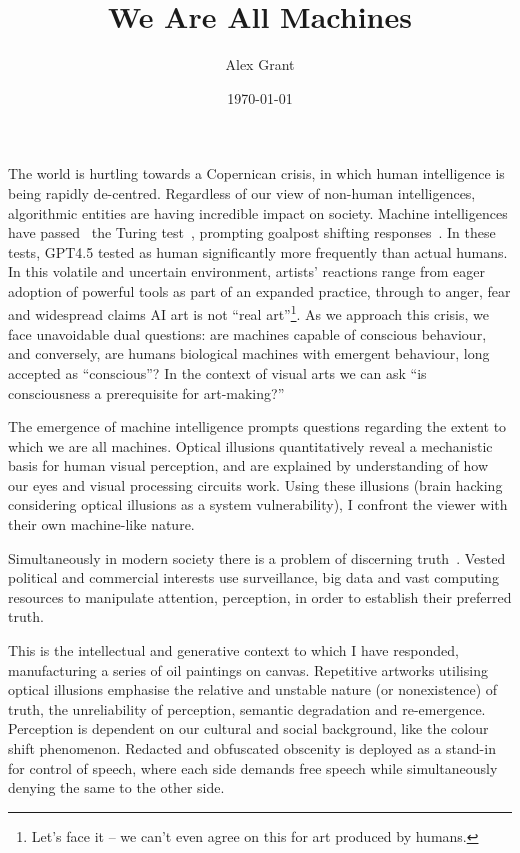 \documentclass[12pt]{article}
\title{We Are All Machines}
\author{Alex Grant}
\date{\today}
\begin{document}
\onehalfspacing
\maketitle

The world is hurtling towards a Copernican crisis, in which human
intelligence is being rapidly de-centred. Regardless of our view of
non-human intelligences, algorithmic entities are having incredible
impact on society. Machine intelligences have
passed~\cite{jones2025largelanguagemodelspass} the Turing
test~\cite{turing1950}, prompting goalpost shifting
responses~\cite{feather2025brainmodelevaluationsneedneuroai}. In these
tests, GPT4.5 tested as human significantly more frequently than
actual humans. In this volatile and uncertain environment, artists'
reactions range from eager adoption of powerful tools as part of an
expanded practice, through to anger, fear and widespread claims AI art
is not ``real art''\footnote{Let's face it -- we can't even agree on
  this for art produced by humans.}. As we approach this crisis, we
face unavoidable dual questions: are machines capable of conscious
behaviour, and conversely, are humans biological machines with
emergent behaviour, long accepted as ``conscious''? In the context of
visual arts we can ask ``is consciousness a prerequisite for
art-making?''

The emergence of machine intelligence prompts questions regarding the
extent to which we are all machines. Optical illusions quantitatively
reveal a mechanistic basis for human visual perception, and are
explained by understanding of how our eyes and visual processing
circuits work. Using these illusions (brain hacking considering
optical illusions as a system vulnerability), I confront the viewer
with their own machine-like nature.

Simultaneously in modern society there is a problem of discerning
truth~\cite{keyes2004posttruth,mcintyre2018posttruth}.  Vested
political and commercial interests use surveillance, big data and vast
computing resources to manipulate attention, perception, in order to
establish their preferred truth.

This is the intellectual and generative context to which I have
responded, manufacturing a series of oil paintings on
canvas. Repetitive artworks utilising optical illusions emphasise the
relative and unstable nature (or nonexistence) of truth, the
unreliability of perception, semantic degradation and
re-emergence. Perception is dependent on our cultural and social
background, like the colour shift phenomenon.  Redacted and obfuscated
obscenity is deployed as a stand-in for control of speech, where each
side demands free speech while simultaneously denying the same to the
other side.
\end{document}
